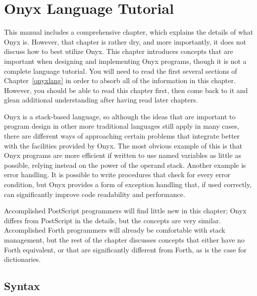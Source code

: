 %
%
%
%
%

\clearemptydoublepage
\chapter{Onyx Language Tutorial}
\label{onyxtut}

This manual includes a comprehensive 
chapter, which explains the details of what Onyx is.  However, that chapter is
rather dry, and more importantly, it does not discuss how to best utilize Onyx.
This chapter introduces concepts that are important when designing and
implementing Onyx programs, though it is not a complete language tutorial.  You
will need to read the first several sections of Chapter~\ref{onyxlang} in order
to absorb all of the information in this chapter.  However, you should be able
to read this chapter first, then come back to it and glean additional
understanding after having read later chapters.

Onyx is a stack-based language, so although the ideas that are important to
program design in other more traditional languages still apply in many cases,
there are different ways of approaching certain problems that integrate better
with the facilities provided by Onyx.  The most obvious example of this is that
Onyx programs are more efficient if written to use named variables as little as
possible, relying instead on the power of the operand stack.  Another example is
error handling.  It is possible to write procedures that check for every error
condition, but Onyx provides a form of exception handling that, if used
correctly, can significantly improve code readability and performance.

Accomplished PostScript programmers will find little new in this chapter; Onyx
differs from PostScript in the details, but the concepts are very similar.
Accomplished Forth programmers will already be comfortable with stack
management, but the rest of the chapter discusses concepts that either have no
Forth equivalent, or that are significantly different from Forth, as is the case
for dictionaries.

\section{Syntax}

